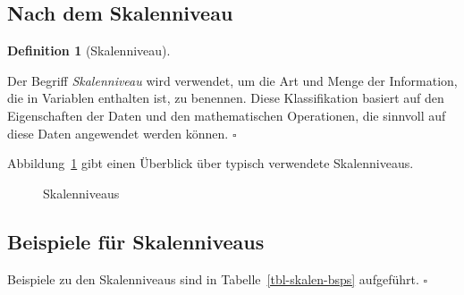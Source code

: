 \documentclass[
  letterpaper,
]{scrbook}
\theoremstyle{definition}
\theoremstyle{definition}
\theoremstyle{definition}
\newtheorem{definition}{Definition}[chapter]
\theoremstyle{remark}
\begin{document}
\subsection{Nach dem Skalenniveau}\label{nach-dem-skalenniveau}

\begin{definition}[Skalenniveau]\protect\hypertarget{def-skalenniveau}{}\label{def-skalenniveau}

Der Begriff \emph{Skalenniveau} wird verwendet, um die Art und Menge der
Information, die in Variablen enthalten ist, zu benennen. Diese
Klassifikation basiert auf den Eigenschaften der Daten und den
mathematischen Operationen, die sinnvoll auf diese Daten angewendet
werden können. \(\square\)

\end{definition}

Abbildung~\ref{fig-skalenniveau} gibt einen Überblick über typisch
verwendete Skalenniveaus.

\begin{figure}


\caption{\label{fig-skalenniveau}Skalenniveaus}

\end{figure}%

\subsection{Beispiele für
Skalenniveaus}\label{beispiele-fuxfcr-skalenniveaus}

Beispiele zu den Skalenniveaus sind in Tabelle~\ref{tbl-skalen-bsps}
aufgeführt. \(\square\)
\end{document}
